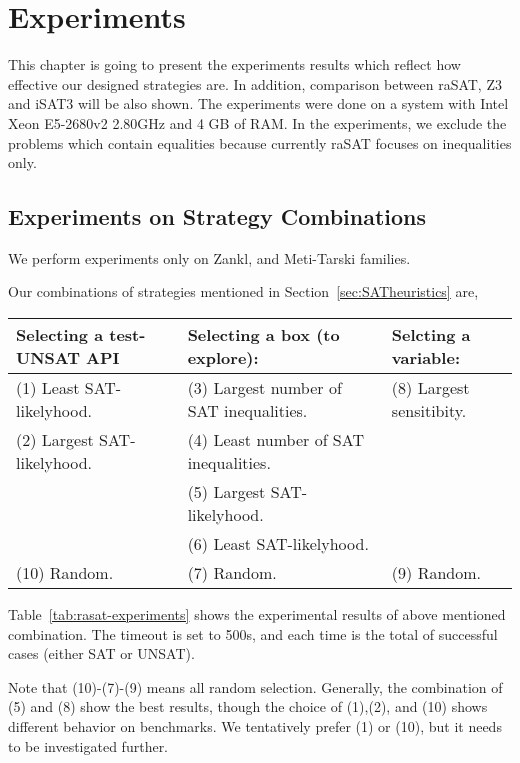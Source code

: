 \chapter{Experiments}
This chapter is going to present the experiments results which reflect how effective our designed strategies are. In addition, comparison between raSAT, Z3 and iSAT3 will be also shown. The experiments were done on a system with  Intel Xeon E5-2680v2 2.80GHz and 4 GB of RAM. In the experiments, we exclude the problems which contain equalities because currently raSAT focuses on inequalities only.

\section{Experiments on Strategy Combinations} \label{sec:expstrategy}

We perform experiments only on Zankl, and Meti-Tarski families. 


Our combinations of strategies mentioned in Section~\ref{sec:SATheuristics} are, 

\medskip
{\centering
\begin{tabular}{l|l|l}
Selecting a test-UNSAT API~~ & Selecting a box (to explore): & 
Selcting a variable: \\  %
\hline

(1) Least SAT-likelyhood. & 
(3) Largest number of SAT inequalities.~~ & 
(8) Largest sensitibity. \\

(2) Largest SAT-likelyhood. & 
(4) Least number of SAT inequalities. & \\

& (5) Largest SAT-likelyhood. & \\

& (6) Least SAT-likelyhood. & \\

(10) Random. & (7) Random. & (9) Random. \\
\end{tabular}
}
\medskip

Table~\ref{tab:rasat-experiments} shows the experimental results of above mentioned combination. 
The timeout is set to 500s, and each time is the total of successful cases 
(either SAT or UNSAT). 

Note that (10)-(7)-(9) means all random selection. 
Generally, the combination of (5) and (8) show the best results, 
though the choice of (1),(2), and (10) shows different behavior on benchmarks. 
We tentatively prefer (1) or (10), but it needs to be investigated further. 

